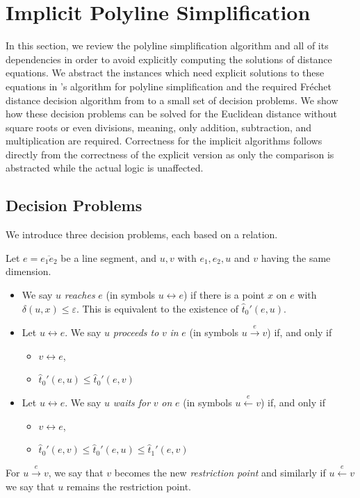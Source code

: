 \section{Implicit Polyline Simplification}\label{sec:implicit_polyline_simplification} 
In this section, we review the polyline simplification algorithm and all of its dependencies in order to avoid explicitly computing the solutions of distance equations. We abstract the instances which need explicit solutions to these equations in \citeauthor{on_optimal_polyline_simplification_using_the_hausdorff_and_frechet_distance}'s algorithm for polyline simplification and the required Fréchet distance decision algorithm from \citeauthor{computing_the_frechet_distance_between_two_polygonal_curves} to a small set of decision problems. 
We show how these decision problems can be solved for the Euclidean distance without square roots or even divisions, meaning, only addition, subtraction, and multiplication are required. Correctness for the implicit algorithms follows directly from the correctness of the explicit version as only the comparison is abstracted while the actual logic is unaffected. 

\subsection{Decision Problems}
We introduce three decision problems, each based on a relation. 
\begin{definition}\label{def:implicit_relations}
  Let \(e = \overline{e_1e_2}\) be a line segment, and \(u, v\) with \(e_1, e_2, u\) and \(v\) having the same dimension. 
  \begin{itemize}
    \item We say \(u\) \emph{reaches} \(e\) (in symbols \(u \leftrightarrow e\)) if there is a point \(x\) on \(e\) with \(\delta(u,x)\leq \varepsilon\). This is equivalent to the existence of \(\hat t_0'(e, u)\).
    \item Let \(u \leftrightarrow e\). We say \(u\) \emph{proceeds to} \(v\) \emph{in} \(e\) (in symbols \(u \overset{e}\rightarrow v\)) if, and only if 
      \begin{itemize}
        \item \(v \leftrightarrow e\), 
        \item \(\hat t_0'(e, u) \leq \hat t_0'(e, v)\)
      \end{itemize}

    \item Let \(u \leftrightarrow e\). We say \(u\) \emph{waits for} \(v\) \emph{on} \(e\) (in symbols \(u \overset{e}\leftarrow v\)) if, and only if
      \begin{itemize}
        \item \(v \leftrightarrow e\), 
        \item \(\hat t_0'(e, v) \leq \hat t_0'(e, u) \leq \hat t_1'(e, v)\)
      \end{itemize}
  \end{itemize}
  For \(u \overset e\rightarrow v\), we say that \(v\) becomes the new \emph{restriction point} and similarly if \(u \overset e\leftarrow v\) we say that \(u\) remains the restriction point.
\end{definition}

